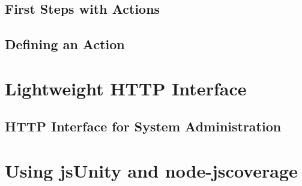 \documentclass[a4paper]{book}
\begin{document}
\subsection{First Steps with Actions}
\label{Actions}

\subsection{Defining an Action}
\label{DefineAction}

\section{Lightweight HTTP Interface}
\subsection{HTTP Interface for System Administration}
\label{RestSystem}

\section{Using jsUnity and node-\/jscoverage}
\label{jsUnity}

\printindex
\end{document}
